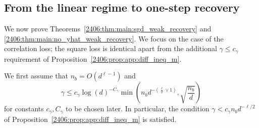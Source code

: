 \subsection{From the linear regime to one-step recovery}
We now prove Theorems~\ref{2406:thm:main:sgd_weak_recovery} and \ref{2406:thm:main:no_yhat_weak_recovery}. We focus on the case of the correlation loss; the square loss is identical apart from the additional $\gamma \leq c_\gamma$ requirement of Proposition~\ref{2406:prop:app:diff_ineq_m}. 

We first assume that $n_b = O(d^{\ell-1})$ and
\begin{equation}\label{2406:eq:app:bound_gamma}
    \gamma \leq  c_\gamma \log(d)^{-C_\gamma} \min\left( n_b d^{-\left(\frac\ell2 \vee 1 \right)}, \sqrt{\frac{n_b}d} \right)
\end{equation} 
for constants $c_\gamma, C_\gamma$ to be chosen later. In particular, the condition $\gamma < c_\gamma n_b d^{-\ell/2}$ of Proposition~\ref{2406:prop:app:diff_ineq_m} is satisfied.

